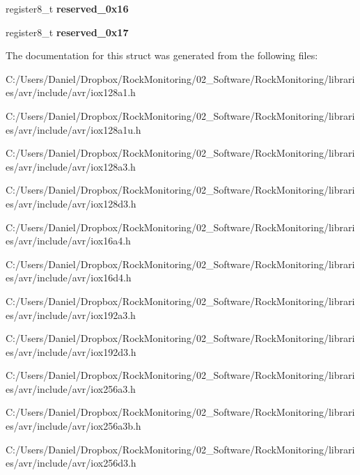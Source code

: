 \begin{DoxyCompactItemize}
\item 
register8\+\_\+t {\bfseries reserved\+\_\+0x16}\hypertarget{struct_a_d_c__struct_aa5510373a4ca471bf8549532b3c536bb}{}\label{struct_a_d_c__struct_aa5510373a4ca471bf8549532b3c536bb}

\item 
register8\+\_\+t {\bfseries reserved\+\_\+0x17}\hypertarget{struct_a_d_c__struct_a68859fc49fa052683d3fd755a9c2c646}{}\label{struct_a_d_c__struct_a68859fc49fa052683d3fd755a9c2c646}

\end{DoxyCompactItemize}


The documentation for this struct was generated from the following files\+:\begin{DoxyCompactItemize}
\item 
C\+:/\+Users/\+Daniel/\+Dropbox/\+Rock\+Monitoring/02\+\_\+\+Software/\+Rock\+Monitoring/libraries/avr/include/avr/iox128a1.\+h\item 
C\+:/\+Users/\+Daniel/\+Dropbox/\+Rock\+Monitoring/02\+\_\+\+Software/\+Rock\+Monitoring/libraries/avr/include/avr/iox128a1u.\+h\item 
C\+:/\+Users/\+Daniel/\+Dropbox/\+Rock\+Monitoring/02\+\_\+\+Software/\+Rock\+Monitoring/libraries/avr/include/avr/iox128a3.\+h\item 
C\+:/\+Users/\+Daniel/\+Dropbox/\+Rock\+Monitoring/02\+\_\+\+Software/\+Rock\+Monitoring/libraries/avr/include/avr/iox128d3.\+h\item 
C\+:/\+Users/\+Daniel/\+Dropbox/\+Rock\+Monitoring/02\+\_\+\+Software/\+Rock\+Monitoring/libraries/avr/include/avr/iox16a4.\+h\item 
C\+:/\+Users/\+Daniel/\+Dropbox/\+Rock\+Monitoring/02\+\_\+\+Software/\+Rock\+Monitoring/libraries/avr/include/avr/iox16d4.\+h\item 
C\+:/\+Users/\+Daniel/\+Dropbox/\+Rock\+Monitoring/02\+\_\+\+Software/\+Rock\+Monitoring/libraries/avr/include/avr/iox192a3.\+h\item 
C\+:/\+Users/\+Daniel/\+Dropbox/\+Rock\+Monitoring/02\+\_\+\+Software/\+Rock\+Monitoring/libraries/avr/include/avr/iox192d3.\+h\item 
C\+:/\+Users/\+Daniel/\+Dropbox/\+Rock\+Monitoring/02\+\_\+\+Software/\+Rock\+Monitoring/libraries/avr/include/avr/iox256a3.\+h\item 
C\+:/\+Users/\+Daniel/\+Dropbox/\+Rock\+Monitoring/02\+\_\+\+Software/\+Rock\+Monitoring/libraries/avr/include/avr/iox256a3b.\+h\item 
C\+:/\+Users/\+Daniel/\+Dropbox/\+Rock\+Monitoring/02\+\_\+\+Software/\+Rock\+Monitoring/libraries/avr/include/avr/iox256d3.\+h\item 

\end{DoxyCompactItemize}
